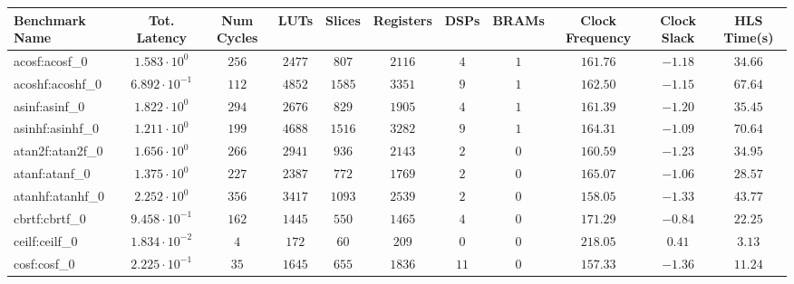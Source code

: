 \begin{tabular}{|l|c|c|c|c|c|c|c|c|c|c|}
\hline
Benchmark Name               & Tot. Latency            & Num Cycles & LUTs      & Slices    & Registers & DSPs    & BRAMs & Clock Frequency & Clock Slack & HLS Time(s) \\
\hline
acosf:acosf\_0               & $ 1.583 \cdot 10^{0}  $ & $ 256    $ & $ 2477  $ & $ 807   $ & $ 2116  $ & $ 4   $ & $ 1 $ & $ 161.76      $ & $ -1.18   $ & $ 34.66   $ \\
acoshf:acoshf\_0             & $ 6.892 \cdot 10^{-1} $ & $ 112    $ & $ 4852  $ & $ 1585  $ & $ 3351  $ & $ 9   $ & $ 1 $ & $ 162.50      $ & $ -1.15   $ & $ 67.64   $ \\
asinf:asinf\_0               & $ 1.822 \cdot 10^{0}  $ & $ 294    $ & $ 2676  $ & $ 829   $ & $ 1905  $ & $ 4   $ & $ 1 $ & $ 161.39      $ & $ -1.20   $ & $ 35.45   $ \\
asinhf:asinhf\_0             & $ 1.211 \cdot 10^{0}  $ & $ 199    $ & $ 4688  $ & $ 1516  $ & $ 3282  $ & $ 9   $ & $ 1 $ & $ 164.31      $ & $ -1.09   $ & $ 70.64   $ \\
atan2f:atan2f\_0             & $ 1.656 \cdot 10^{0}  $ & $ 266    $ & $ 2941  $ & $ 936   $ & $ 2143  $ & $ 2   $ & $ 0 $ & $ 160.59      $ & $ -1.23   $ & $ 34.95   $ \\
atanf:atanf\_0               & $ 1.375 \cdot 10^{0}  $ & $ 227    $ & $ 2387  $ & $ 772   $ & $ 1769  $ & $ 2   $ & $ 0 $ & $ 165.07      $ & $ -1.06   $ & $ 28.57   $ \\
atanhf:atanhf\_0             & $ 2.252 \cdot 10^{0}  $ & $ 356    $ & $ 3417  $ & $ 1093  $ & $ 2539  $ & $ 2   $ & $ 0 $ & $ 158.05      $ & $ -1.33   $ & $ 43.77   $ \\
cbrtf:cbrtf\_0               & $ 9.458 \cdot 10^{-1} $ & $ 162    $ & $ 1445  $ & $ 550   $ & $ 1465  $ & $ 4   $ & $ 0 $ & $ 171.29      $ & $ -0.84   $ & $ 22.25   $ \\
ceilf:ceilf\_0               & $ 1.834 \cdot 10^{-2} $ & $ 4      $ & $ 172   $ & $ 60    $ & $ 209   $ & $ 0   $ & $ 0 $ & $ 218.05      $ & $ 0.41    $ & $ 3.13    $ \\
cosf:cosf\_0                 & $ 2.225 \cdot 10^{-1} $ & $ 35     $ & $ 1645  $ & $ 655   $ & $ 1836  $ & $ 11  $ & $ 0 $ & $ 157.33      $ & $ -1.36   $ & $ 11.24   $ \\

\end{tabular}
